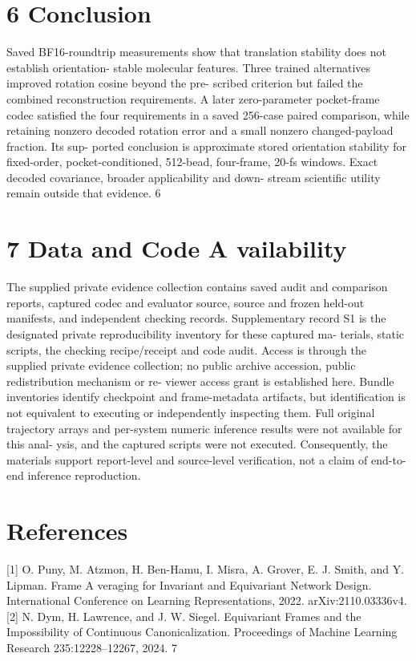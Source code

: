 \documentclass[11pt]{article}
\begin{document}
\section*{6 Conclusion}

Saved BF16-roundtrip measurements show that translation stability does not establish orientation-
stable molecular features. Three trained alternatives improved rotation cosine beyond the pre-
scribed criterion but failed the combined reconstruction requirements. A later zero-parameter
pocket-frame codec satisfied the four requirements in a saved 256-case paired comparison, while
retaining nonzero decoded rotation error and a small nonzero changed-payload fraction. Its sup-
ported conclusion is approximate stored orientation stability for fixed-order, pocket-conditioned,
512-bead, four-frame, 20-fs windows. Exact decoded covariance, broader applicability and down-
stream scientific utility remain outside that evidence.
6


\section*{7 Data and Code A vailability}

The supplied private evidence collection contains saved audit and comparison reports, captured
codec and evaluator source, source and frozen held-out manifests, and independent checking records.
Supplementary record S1 is the designated private reproducibility inventory for these captured ma-
terials, static scripts, the checking recipe/receipt and code audit. Access is through the supplied
private evidence collection; no public archive accession, public redistribution mechanism or re-
viewer access grant is established here. Bundle inventories identify checkpoint and frame-metadata
artifacts, but identification is not equivalent to executing or independently inspecting them. Full
original trajectory arrays and per-system numeric inference results were not available for this anal-
ysis, and the captured scripts were not executed. Consequently, the materials support report-level
and source-level verification, not a claim of end-to-end inference reproduction.

\section*{References}

[1] O. Puny, M. Atzmon, H. Ben-Hamu, I. Misra, A. Grover, E. J. Smith, and Y. Lipman. Frame
A veraging for Invariant and Equivariant Network Design. International Conference on Learning
Representations, 2022. arXiv:2110.03336v4.
[2] N. Dym, H. Lawrence, and J. W. Siegel. Equivariant Frames and the Impossibility of Continuous
Canonicalization. Proceedings of Machine Learning Research 235:12228–12267, 2024.
7
\end{document}
